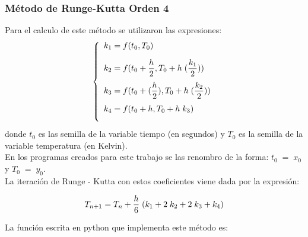 \documentclass[10pt,a4paper]{article}
\begin{document}
\subsubsection{Método de Runge-Kutta Orden 4}
Para el calculo de este método se utilizaron las expresiones:
\begin{equation}
\left\{ 
\begin{array}{ll}
\notag k_{1} = f(t_{0}, T_{0})\\ [10pt]
\notag k_{2} = f(t_{0} + \dfrac{h}{2}, T_{0} + h\;(\dfrac{k_{1}}{2}))\\ [10pt]
\notag k_{3} = f(t_{0} + (\dfrac{h}{2}), T_{0} + h\;(\dfrac{k_{2}}{2}))\\ [10pt]
\notag k_{4} = f(t_{0} + h, T_{0} + h\;k_{3})\\ [10pt]
\end{array} \right.
\end{equation}
donde $t_{0}$ es las semilla de la variable tiempo (en segundos) y $T_{0}$ es la semilla de la variable temperatura (en Kelvin).\\
En los programas creados para este trabajo se las renombro de la forma:
$t_{0}\;=\;x_{0}$ y $T_{0}\;=\;y_{0}$.\\
La iteración de Runge - Kutta con estos coeficientes viene dada por la expresión:

\begin{equation}
\notag T_{n+1} = T_{n} + \dfrac{h}{6}\;(k_{1} + 2\;k_{2} + 2\;k_{3} + k_{4})\\
\end{equation}

La función escrita en python que implementa este método es:
\end{document}
